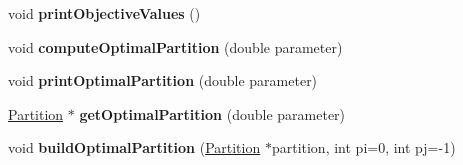 \begin{DoxyCompactItemize}
\item 
\hypertarget{classHONode_a5ec6f4b4c9313d372282114af15d0a6d}{void {\bfseries print\-Objective\-Values} ()}\label{classHONode_a5ec6f4b4c9313d372282114af15d0a6d}

\item 
\hypertarget{classHONode_a1ede3a94ec46b81b2250874a6dcefb98}{void {\bfseries compute\-Optimal\-Partition} (double parameter)}\label{classHONode_a1ede3a94ec46b81b2250874a6dcefb98}

\item 
\hypertarget{classHONode_a9a4df13c77c8ab4b541446d3b3b4cacd}{void {\bfseries print\-Optimal\-Partition} (double parameter)}\label{classHONode_a9a4df13c77c8ab4b541446d3b3b4cacd}

\item 
\hypertarget{classHONode_af2905a01a848793e8614beb12bb62df8}{\hyperlink{classPartition}{Partition} $\ast$ {\bfseries get\-Optimal\-Partition} (double parameter)}\label{classHONode_af2905a01a848793e8614beb12bb62df8}

\item 
\hypertarget{classHONode_abfd6c5724bd46fd91c6537554e9d4d1b}{void {\bfseries build\-Optimal\-Partition} (\hyperlink{classPartition}{Partition} $\ast$partition, int pi=0, int pj=-\/1)}\label{classHONode_abfd6c5724bd46fd91c6537554e9d4d1b}

\end{DoxyCompactItemize}
